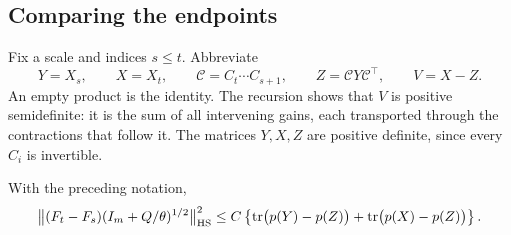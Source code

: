 \subsection{Comparing the endpoints}

Fix a scale and indices $s\le t$.  Abbreviate
\[
 Y=X_s,\qquad X=X_t,\qquad
 \mathcal C=C_t\cdots C_{s+1},\qquad Z=\mathcal C Y\mathcal C^\top,
 \qquad V=X-Z.
\]
An empty product is the identity.  The recursion shows that $V$ is
positive semidefinite: it is the sum of all intervening gains,
each transported through the contractions that follow it.
The matrices $Y,X,Z$ are positive definite, since every $C_i$ is
invertible.

\begin{lemma}
\label{lem:endpoint-comparison}
With the preceding notation,
\begin{equation}
 \bigl\lVert(F_t-F_s)(I_m+Q/\theta)^{1/2}\bigr\rVert_{\mathrm{HS}}^2
 \le C\left\{
   \operatorname{tr}\bigl(p(Y)-p(Z)\bigr)
   +\operatorname{tr}\bigl(p(X)-p(Z)\bigr)
 \right\}.
 \label{eq:endpoint-comparison}
\end{equation}
\end{lemma}

